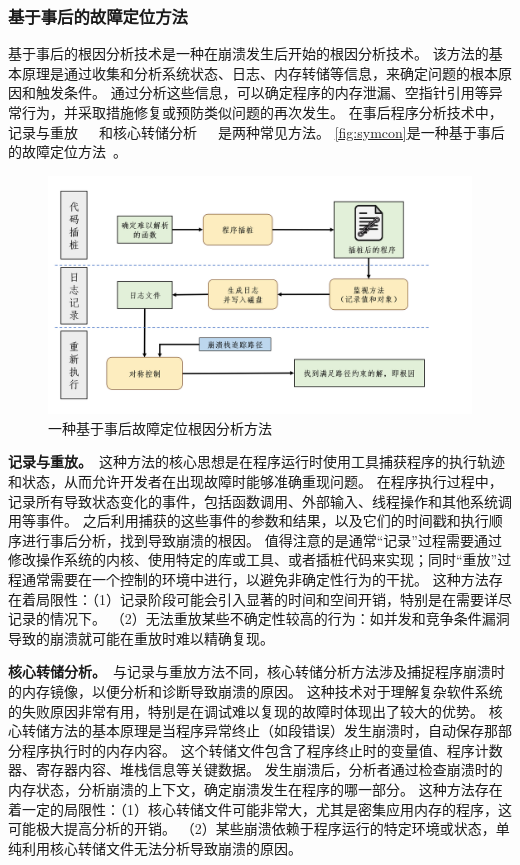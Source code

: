 \subsubsection{基于事后的故障定位方法}
基于事后的根因分析技术是一种在崩溃发生后开始的根因分析技术。
该方法的基本原理是通过收集和分析系统状态、日志、内存转储等信息，来确定问题的根本原因和触发条件。
通过分析这些信息，可以确定程序的内存泄漏、空指针引用等异常行为，并采取措施修复或预防类似问题的再次发生。
在事后程序分析技术中，记录与重放~\cite{ReCrash2008}~\cite{SymCrash2014}~\cite{Chronicler2013}和核心转储分析~\cite{RETracer2016}~\cite{Making2015}~\cite{CREDAL2016}是两种常见方法。
\autoref{fig:symcon}是一种基于事后的故障定位方法~\cite{SymCrash2014}。
\begin{figure}[h]
    \centering
    \includegraphics[width=1.0\textwidth]{./figure/Symcon.png}
    \caption{一种基于事后故障定位根因分析方法}
    \label{fig:symcon}
\end{figure}


\textbf{记录与重放。}\ 这种方法的核心思想是在程序运行时使用工具捕获程序的执行轨迹和状态，从而允许开发者在出现故障时能够准确重现问题。
在程序执行过程中，记录所有导致状态变化的事件，包括函数调用、外部输入、线程操作和其他系统调用等事件。
之后利用捕获的这些事件的参数和结果，以及它们的时间戳和执行顺序进行事后分析，找到导致崩溃的根因。
值得注意的是通常“记录”过程需要通过修改操作系统的内核、使用特定的库或工具、或者插桩代码来实现；同时“重放”过程通常需要在一个控制的环境中进行，以避免非确定性行为的干扰。
这种方法存在着局限性：（1）记录阶段可能会引入显著的时间和空间开销，特别是在需要详尽记录的情况下。
（2）无法重放某些不确定性较高的行为：如并发和竞争条件漏洞导致的崩溃就可能在重放时难以精确复现。

\textbf{核心转储分析。}\ 与记录与重放方法不同，核心转储分析方法涉及捕捉程序崩溃时的内存镜像，以便分析和诊断导致崩溃的原因。
这种技术对于理解复杂软件系统的失败原因非常有用，特别是在调试难以复现的故障时体现出了较大的优势。
核心转储方法的基本原理是当程序异常终止（如段错误）发生崩溃时，自动保存那部分程序执行时的内存内容。
这个转储文件包含了程序终止时的变量值、程序计数器、寄存器内容、堆栈信息等关键数据。
发生崩溃后，分析者通过检查崩溃时的内存状态，分析崩溃的上下文，确定崩溃发生在程序的哪一部分。
这种方法存在着一定的局限性：（1）核心转储文件可能非常大，尤其是密集应用内存的程序，这可能极大提高分析的开销。
（2）某些崩溃依赖于程序运行的特定环境或状态，单纯利用核心转储文件无法分析导致崩溃的原因。


